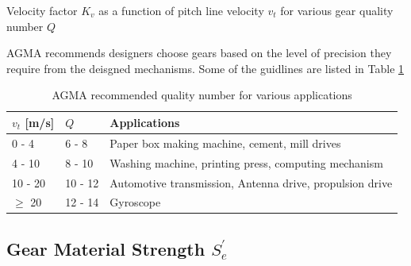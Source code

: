 \documentclass[a4paper,openany]{kaobook}
\begin{document}
\begin{marginfigure}
  \centering
\caption{Velocity factor \(K_v\) as a function of pitch line velocity \(v_t\) for various gear quality number \(Q\)}
\end{marginfigure}

AGMA recommends designers choose gears based on the level of precision they require from the deisgned mechanisms. Some of the guidlines are listed in Table \ref{tab: AGMA recommended quality}

\begin{table}[htbp]
\caption{\label{tab: AGMA recommended quality}AGMA recommended quality number for various applications}
\centering
\begin{tabular}{llp{5cm}}
\toprule
\(v_{t}\) [m/s] & \(Q\) & Applications\\
\midrule
0 - 4 & 6 - 8 & Paper box making machine, cement, mill drives\\
4 - 10 & 8 - 10 & Washing machine, printing press, computing mechanism\\
10 - 20 & 10 - 12 & Automotive transmission, Antenna drive, propulsion drive\\
\(\geqslant\) 20 & 12 - 14 & Gyroscope\\
\bottomrule
\end{tabular}
\end{table}

\subsection{Gear Material Strength \(S_e^{\prime}\)}
\label{sec:org38f3f05}
\end{document}
